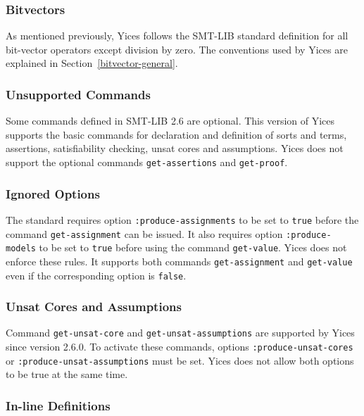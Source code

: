\documentclass[11pt,twoside,fleqn,openright,titlepage]{cslreport}
\begin{document}
\subsubsection*{Bitvectors}

As mentioned previously, Yices follows the SMT-LIB standard definition
for all bit-vector operators except division by zero. The conventions
used by Yices are explained in Section~\ref{bitvector-general}.

\subsubsection*{Unsupported Commands}

Some commands defined in SMT-LIB 2.6 are optional. This version of
Yices supports the basic commands for declaration and definition of
sorts and terms, assertions, satisfiability checking, unsat cores and
assumptions. Yices does not support the optional commands
\texttt{get-assertions} and \texttt{get-proof}.

\subsubsection*{Ignored Options}

The standard requires option \texttt{:produce-assignments} to be set
to \texttt{true} before the command \texttt{get-assignment} can be
issued.  It also requires option \texttt{:produce-models} to be set to
\texttt{true} before using the command \texttt{get-value}. Yices does
not enforce these rules. It supports both commands
\texttt{get-assignment} and \texttt{get-value} even if the
corresponding option is \texttt{false}.

\subsubsection*{Unsat Cores and Assumptions}

Command \texttt{get-unsat-core} and \texttt{get-unsat-assumptions} are
supported by Yices since version 2.6.0. To activate these commands,
options \texttt{:produce-unsat-cores} or
\texttt{:produce-unsat-assumptions} must be set. Yices does not allow
both options to be true at the same time.

\subsubsection*{In-line Definitions}
\end{document}
